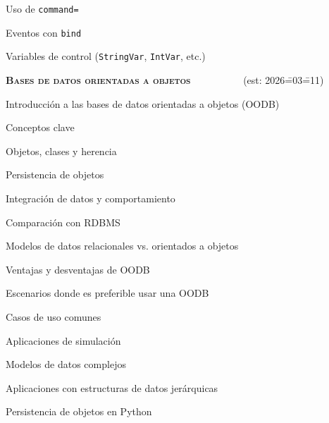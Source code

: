 \begin{longenum}
\begin{longenum}
\begin{longenum}
            \item Uso de \texttt{command=}
            \item Eventos con \texttt{bind}
            \item Variables de control (\texttt{StringVar}, \texttt{IntVar}, etc.)
        \end{longenum}
    \end{longenum}
    \item \textbf{\textsc{Bases de datos orientadas a objetos}} \ \ \ \ \ \ \ \ \ \ (est: 2026\==03\==11)
    \begin{longenum}
        \item Introducción a las bases de datos orientadas a objetos (OODB)
        \begin{longenum}
            \item Conceptos clave
            \begin{longenum}
                \item Objetos, clases y herencia
                \item Persistencia de objetos
                \item Integración de datos y comportamiento
            \end{longenum}
            \item Comparación con RDBMS
            \begin{longenum}
                \item Modelos de datos relacionales vs. orientados a objetos
                \item Ventajas y desventajas de OODB
                \item Escenarios donde es preferible usar una OODB
            \end{longenum}
            \item Casos de uso comunes
            \begin{longenum}
                \item Aplicaciones de simulación
                \item Modelos de datos complejos
                \item Aplicaciones con estructuras de datos jerárquicas
            \end{longenum}
        \end{longenum}
        \item Persistencia de objetos en Python
        \begin{longenum}

\end{longenum}
\end{longenum}
\end{longenum}

